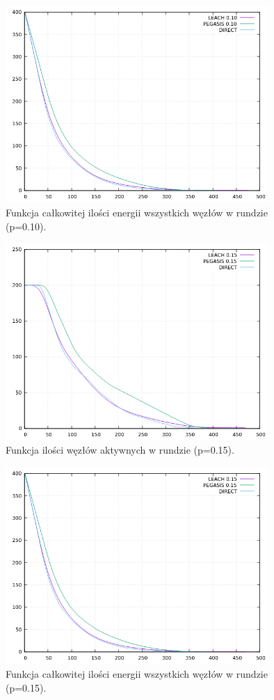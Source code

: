 \documentclass[a4paper,12pt,twoside,openany]{report}
\begin{document}
\begin{figure}[H]
 \centering
 \includegraphics[width=10cm]{images/gnuplot/test_4/energy_in_round_p010.png}
 \caption{Funkcja całkowitej ilości energii wszystkich węzłów w rundzie (p=0.10).}
\end{figure}

\begin{figure}[H]
 \centering
 \includegraphics[width=10cm]{images/gnuplot/test_4/nodes_in_round_p015.png}
 \caption{Funkcja ilości węzłów aktywnych w rundzie (p=0.15).}
\end{figure}

\begin{figure}[H]
 \centering
 \includegraphics[width=10cm]{images/gnuplot/test_4/energy_in_round_p015.png}
 \caption{Funkcja całkowitej ilości energii wszystkich węzłów w rundzie (p=0.15).}
\end{figure}
\end{document}
